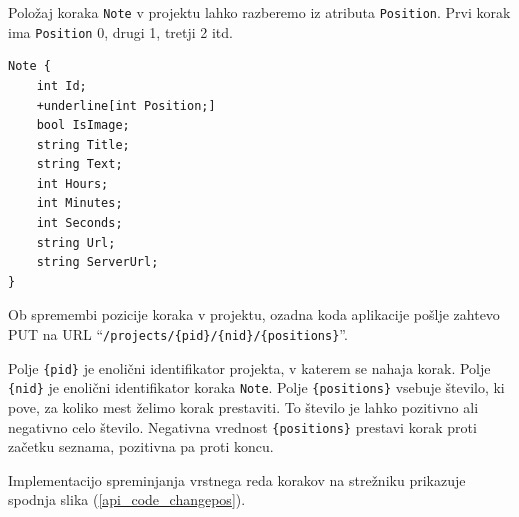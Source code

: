 \documentclass[a4paper, 12pt]{book}
\begin{document}
Položaj koraka \texttt{Note} v projektu lahko razberemo iz atributa \texttt{Position}.
Prvi korak ima \texttt{Position} 0, drugi 1, tretji 2 itd.


\begin{Verbatim}[commandchars=+\[\]]
Note { 
    int Id; 
    +underline[int Position;]
    bool IsImage;  
    string Title; 
    string Text;
    int Hours; 
    int Minutes;
    int Seconds;
    string Url;
    string ServerUrl;
}
\end{Verbatim}


Ob spremembi pozicije koraka v projektu, ozadna koda aplikacije pošlje zahtevo PUT na URL \enquote{\texttt{/projects/\{pid\}/\{nid\}/\{positions\}}}.

Polje \texttt{\{pid\}} je enolični identifikator projekta, v katerem se nahaja korak.
Polje \texttt{\{nid\}} je enolični identifikator koraka \texttt{Note}.
Polje \texttt{\{positions\}} vsebuje število, ki pove, za koliko mest želimo korak prestaviti.
To število je lahko pozitivno ali negativno celo število.
Negativna vrednost \texttt{\{positions\}} prestavi korak proti začetku seznama, pozitivna pa proti koncu.

Implementacijo spreminjanja vrstnega reda korakov na strežniku prikazuje spodnja slika (\ref{api_code_changepos}).

\clearpage
\end{document}

